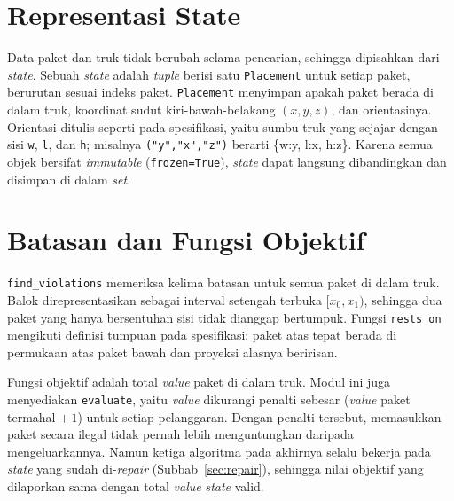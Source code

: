 \section{Representasi State}

Data paket dan truk tidak berubah selama pencarian, sehingga dipisahkan dari
\textit{state}. Sebuah \textit{state} adalah \textit{tuple} berisi satu
\texttt{Placement} untuk setiap paket, berurutan sesuai indeks paket. \texttt{Placement}
menyimpan apakah paket berada di dalam truk, koordinat sudut kiri-bawah-belakang
$(x,y,z)$, dan orientasinya. Orientasi ditulis seperti pada spesifikasi, yaitu sumbu
truk yang sejajar dengan sisi \texttt{w}, \texttt{l}, dan \texttt{h}; misalnya
\texttt{("y","x","z")} berarti \{w:y, l:x, h:z\}. Karena semua objek bersifat
\textit{immutable} (\texttt{frozen=True}), \textit{state} dapat langsung dibandingkan
dan disimpan di dalam \textit{set}.




\section{Batasan dan Fungsi Objektif}

\texttt{find\_violations} memeriksa kelima batasan untuk semua paket di dalam truk.
Balok direpresentasikan sebagai interval setengah terbuka $[x_0,x_1)$, sehingga dua
paket yang hanya bersentuhan sisi tidak dianggap bertumpuk. Fungsi
\texttt{rests\_on} mengikuti definisi tumpuan pada spesifikasi: paket atas tepat
berada di permukaan atas paket bawah dan proyeksi alasnya beririsan.



Fungsi objektif adalah total \textit{value} paket di dalam truk. Modul ini juga
menyediakan \texttt{evaluate}, yaitu \textit{value} dikurangi penalti sebesar
(\textit{value} paket termahal $+\,1$) untuk setiap pelanggaran. Dengan penalti tersebut,
memasukkan paket secara ilegal tidak pernah lebih menguntungkan daripada
mengeluarkannya. Namun ketiga algoritma pada akhirnya selalu bekerja pada
\textit{state} yang sudah di-\textit{repair} (Subbab~\ref{sec:repair}), sehingga nilai
objektif yang dilaporkan sama dengan total \textit{value} \textit{state} valid.

